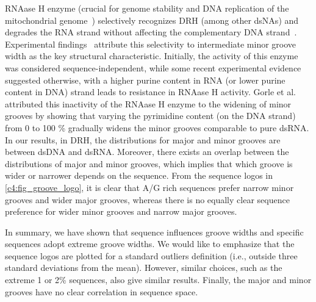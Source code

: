RNAase H enzyme (crucial for genome stability and DNA replication of the mitochondrial genome~\cite{shaw2008recognition,brambati2020dark}) selectively recognizes DRH (among other dsNAs) and degrades the RNA strand without affecting the complementary DNA strand~\cite{stein1969enzyme}.
Experimental findings~\cite{fedoroff1997solution,szyperski1999nmr} attribute this selectivity to intermediate minor groove width as the key structural characteristic. 
Initially, the activity of this enzyme was considered sequence-independent, while some recent experimental evidence~\cite{huang1998structure,sarafianos2001crystal} suggested otherwise, with a higher purine content in RNA (or lower purine content in DNA) strand leads to resistance in RNAase H activity.
Gorle et al.~\cite{suresh2014dna} attributed this inactivity of the RNAase H enzyme to the widening of minor grooves by showing that varying the pyrimidine content (on the DNA strand) from 0 to 100 \% gradually widens the minor grooves comparable to pure dsRNA. 
In our results, in DRH, the distributions for major and minor grooves are between dsDNA and dsRNA. 
Moreover, there exists an overlap between the distributions of major and minor grooves, which implies that which groove is wider or narrower depends on the sequence.
From the sequence logos in \cref{c4:fig_groove_logo}, it is clear that A/G rich sequences prefer narrow minor grooves and wider major grooves, whereas there is no equally clear sequence preference for wider minor grooves and narrow major grooves.

In summary, we have shown that sequence influences groove widths and specific sequences adopt extreme groove widths.
We would like to emphasize that the sequence logos are plotted for a standard outliers definition (i.e., outside three standard deviations from the mean).
However, similar choices, such as the extreme 1 or 2\% sequences, also give similar results.
Finally, the major and minor grooves have no clear correlation in sequence space.


